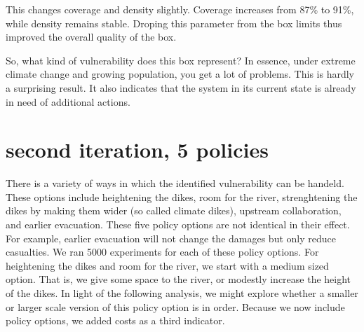 \documentclass{article}
\begin{document}
    This changes coverage and density slightly. Coverage increases from 87\%
to 91\%, while density remains stable. Droping this parameter from the
box limits thus improved the overall quality of the box.

So, what kind of vulnerability does this box represent? In essence,
under extreme climate change and growing population, you get a lot of
problems. This is hardly a surprising result. It also indicates that the
system in its current state is already in need of additional actions.

    \section{second iteration, 5
policies}\label{second-iteration-5-policies}

There is a variety of ways in which the identified vulnerability can be
handeld. These options include heightening the dikes, room for the
river, strenghtening the dikes by making them wider (so called climate
dikes), upstream collaboration, and earlier evacuation. These five
policy options are not identical in their effect. For example, earlier
evacuation will not change the damages but only reduce casualties. We
ran 5000 experiments for each of these policy options. For heightening
the dikes and room for the river, we start with a medium sized option.
That is, we give some space to the river, or modestly increase the
height of the dikes. In light of the following analysis, we might
explore whether a smaller or larger scale version of this policy option
is in order. Because we now include policy options, we added costs as a
third indicator.
\end{document}
